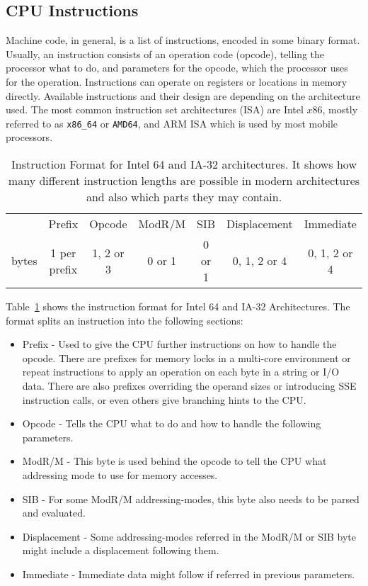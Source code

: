 \subsection{CPU Instructions}

Machine code, in general, is a list of instructions, encoded in some binary
format. Usually, an instruction consists of an operation code (opcode), telling
the processor what to do, and parameters for the opcode, which the processor
uses for the operation. Instructions can operate on registers or locations in
memory directly. Available instructions and their design are depending on the
architecture used. The most common instruction set architectures (ISA) are Intel
$x86$, mostly referred to as \texttt{x86\_64} or \texttt{AMD64}, and ARM ISA
which is used by most mobile processors.

\begin{table}[]
\centering
\begin{tabular}{ccccccc}
\cline{2-7}
\multicolumn{1}{c|}{} & \multicolumn{1}{c|}{Prefix} &
\multicolumn{1}{c|}{Opcode} & \multicolumn{1}{c|}{ModR/M} &
\multicolumn{1}{c|}{SIB} & \multicolumn{1}{c|}{Displacement} &
\multicolumn{1}{c|}{Immediate} \\ \cline{2-7}
bytes         & 1 per prefix                & 1, 2 or 3
 & 0 or 1                      & 0 or 1                   & 0, 1, 2 or 4
             & 0, 1, 2 or 4
\end{tabular}
\caption{Instruction Format for Intel 64 and IA-32 architectures. It shows how
many different instruction lengths are possible in modern architectures and
also which parts they may contain.}
\label{tab:instrfor}
\end{table}

Table~\ref{tab:instrfor} shows the instruction format for Intel 64 and IA-32
Architectures. The format splits an instruction into the following sections:

\begin{itemize}
  \item Prefix - Used to give the CPU further instructions on how to handle the
opcode. There are prefixes for memory locks in a multi-core environment or
repeat instructions to apply an operation on each byte in a string or I/O data.
There are also prefixes overriding the operand sizes or introducing SSE
instruction calls, or even others give branching hints to the CPU.
  \item Opcode - Tells the CPU what to do and how to handle the following
parameters.
  \item ModR/M - This byte is used behind the opcode to tell the CPU what
addressing mode to use for memory accesses.
  \item SIB - For some ModR/M addressing-modes, this byte also needs to be
parsed and evaluated.
  \item Displacement - Some addressing-modes referred in the ModR/M or SIB byte
might include a displacement following them.
  \item Immediate - Immediate data might follow if referred in previous
parameters.
\end{itemize}

